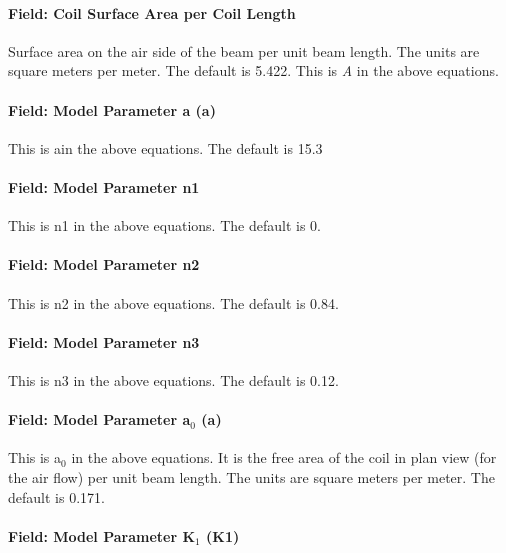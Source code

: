 \paragraph{Field: Coil Surface Area per Coil Length}\label{field-coil-surface-area-per-coil-length}

Surface area on the air side of the beam per unit beam length. The units are square meters per meter. The default is 5.422. This is \emph{A} in the above equations.

\paragraph{Field: Model Parameter a (a)}\label{field-model-parameter-a-a}

This is ain the above equations. The default is 15.3

\paragraph{Field: Model Parameter n1}\label{field-model-parameter-n1}

This is n1 in the above equations. The default is 0.

\paragraph{Field: Model Parameter n2}\label{field-model-parameter-n2}

This is n2 in the above equations. The default is 0.84.

\paragraph{Field: Model Parameter n3}\label{field-model-parameter-n3}

This is n3 in the above equations. The default is 0.12.

\paragraph{Field: Model Parameter a\(_{0}\) (a)}\label{field-model-parameter-aux5f0-a}

This is a\(_{0}\) in the above equations. It is the free area of the coil in plan view (for the air flow) per unit beam length. The units are square meters per meter. The default is 0.171.

\paragraph{Field: Model Parameter K\(_{1}\) (K1)}\label{field-model-parameter-kux5f1-k1}

